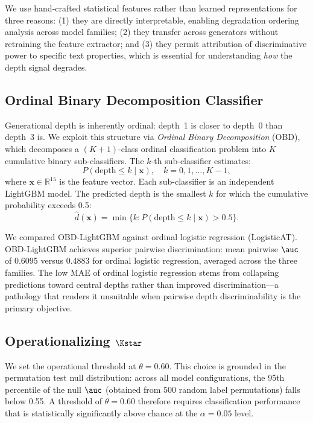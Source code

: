 We use hand-crafted statistical features rather than learned representations for three reasons: (1) they are directly interpretable, enabling degradation ordering analysis across model families; (2) they transfer across generators without retraining the feature extractor; and (3) they permit attribution of discriminative power to specific text properties, which is essential for understanding \emph{how} the depth signal degrades.

\subsection{Ordinal Binary Decomposition Classifier}
\label{sec:classifier}

Generational depth is inherently ordinal: depth~1 is closer to depth~0 than depth~3 is.
We exploit this structure via \emph{Ordinal Binary Decomposition} (OBD), which decomposes a $(K{+}1)$-class ordinal classification problem into $K$ cumulative binary sub-classifiers.
The $k$-th sub-classifier estimates:
\begin{equation}
  P(\text{depth} \leq k \mid \mathbf{x}), \quad k = 0, 1, \ldots, K{-}1,
\end{equation}
where $\mathbf{x} \in \mathbb{R}^{15}$ is the feature vector.
Each sub-classifier is an independent LightGBM model.
The predicted depth is the smallest $k$ for which the cumulative probability exceeds 0.5:
\begin{equation}
  \hat{d}(\mathbf{x}) = \min\{k : P(\text{depth} \leq k \mid \mathbf{x}) > 0.5\}.
\end{equation}

We compared OBD-LightGBM against ordinal logistic regression (LogisticAT).
OBD-LightGBM achieves superior pairwise discrimination: mean pairwise $\auc$ of 0.6095 versus 0.4883 for ordinal logistic regression, averaged across the three families.
The low MAE of ordinal logistic regression stems from collapsing predictions toward central depths rather than improved discrimination---a pathology that renders it unsuitable when pairwise depth discriminability is the primary objective.

\subsection{Operationalizing $\Kstar$}
\label{sec:kstar_operational}

We set the operational threshold at $\theta = 0.60$.
This choice is grounded in the permutation test null distribution: across all model configurations, the 95th percentile of the null $\auc$ (obtained from 500 random label permutations) falls below 0.55.
A threshold of $\theta = 0.60$ therefore requires classification performance that is statistically significantly above chance at the $\alpha = 0.05$ level.

